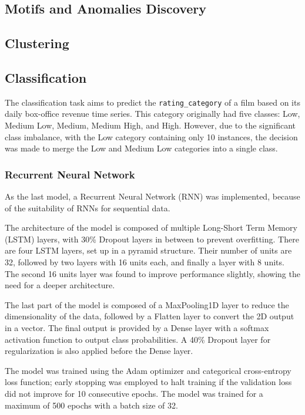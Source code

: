 \subsection{Motifs and Anomalies Discovery}



\subsection{Clustering}

\subsection{Classification}

The classification task aims to predict the \texttt{rating\_category} of a film based on its daily box-office revenue time series.
This category originally had five classes: Low, Medium Low, Medium, Medium High, and High.
However, due to the significant class imbalance, with the Low category containing only 10 instances,
the decision was made to merge the Low and Medium Low categories into a single class.


\subsubsection{Recurrent Neural Network}
As the last model, a Recurrent Neural Network (RNN) was implemented,
because of the suitability of RNNs for sequential data.

The architecture of the model is composed of multiple Long-Short Term Memory (LSTM)
layers, with 30\% Dropout layers in between to prevent overfitting.
There are four LSTM layers, set up in a pyramid structure.
Their number of units are 32, followed by two layers with 16 units each, and
finally a layer with 8 units. The second 16 units layer was found to improve
performance slightly, showing the need for a deeper architecture.

The last part of the model is composed of a MaxPooling1D layer to reduce the
dimensionality of the data, followed by a Flatten layer to convert the 2D output
in a vector. The final output is provided by a Dense layer with a softmax
activation function to output class probabilities.
A 40\% Dropout layer for regularization is also applied before the Dense layer.


The model was trained using the Adam optimizer and categorical cross-entropy
loss function; early stopping was employed to halt training if the validation
loss did not improve for 10 consecutive epochs.
The model was trained for a maximum of 500 epochs with a batch size of 32.\\

